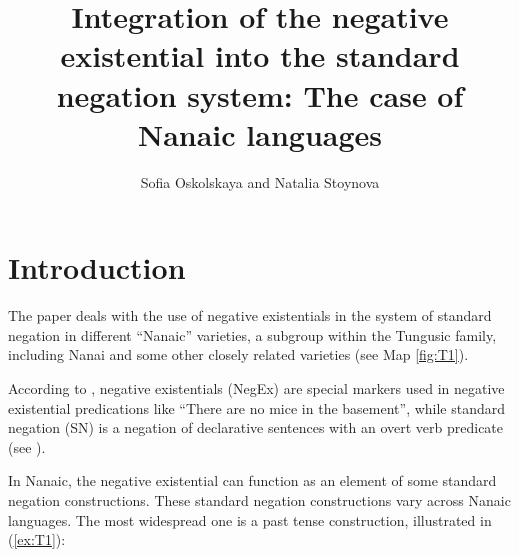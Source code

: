 \documentclass[output=paper,colorlinks,citecolor=brown]{langscibook}
\author{Sofia Oskolskaya\affiliation{Institute for Linguistic Studies, RAS} and Natalia Stoynova\affiliation{Russian Language Institute, RAS; NRU Higher School of Economics}}
\title{Integration of the negative existential into the standard negation system: The case of Nanaic languages}
\begin{document}
\AffiliationsWithoutIndexing{}
\maketitle

\section{Introduction}\label{sec:T1}

The paper deals with the use of negative existentials in the system of standard negation in different “Nanaic” varieties, a subgroup within the Tungusic family, including Nanai and some other closely related varieties (see Map \ref{fig:T1}).

According to \citet[107]{Veselinova2013}, negative existentials (NegEx) are special markers used in negative existential predications like “There are no mice in the basement”, while standard negation (SN) is a negation of declarative sentences with an overt verb predicate (see \citealp[39–45]{Miestamo2005}).

In Nanaic, the negative existential can function as an element of some standard negation constructions. These standard negation constructions vary across Nanaic languages. The most widespread one is a past tense construction, illustrated in (\ref{ex:T1}):
\end{document}

